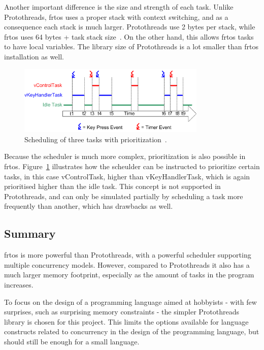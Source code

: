 Another important difference is the size and strength of each task. Unlike Protothreads, \gls{frtos} uses a proper stack with context switching, and as a consequence each stack is much larger. Protothreads use 2 bytes per stack, while \gls{frtos} uses 64 bytes + task stack size~\cite{AboutRTOS}. On the other hand, this allows \gls{frtos} tasks to have local variables. The library size of Protothreads is a lot smaller than \gls{frtos} installation as well.


\begin{figure}[htbp]
  \centering
  \includegraphics[width=0.8\textwidth]{figures/FreeRTOS_Prioritization.png}
  \caption{Scheduling of three tasks with prioritization~\cite{SchedulingRTOS}.}
  \label{fig:freertosprio}
\end{figure}


Because the scheduler is much more complex, prioritization is also possible in \gls{frtos}. Figure~\ref{fig:freertosprio} illustrates how the scheulder can be instructed to prioritize certain tasks, in this case vControlTask, higher than vKeyHandlerTask, which is again prioritised higher than the idle task. This concept is not supported in Protothreads, and can only be simulated partially by scheduling a task more frequently than another, which has drawbacks as well.


\subsection{Summary}\label{subsec:concurrencysummary}
\gls{frtos} is more powerful than Protothreads, with a powerful scheduler supporting multiple concurrency models. However, compared to Protothreads it also has a much larger memory footprint, especially as the amount of tasks in the program increases.

To focus on the design of a programming language aimed at hobbyists - with few surprises, such as surprising memory constraints - the simpler Protothreads library is chosen for this project. This limits the options available for language constructs related to concurrency in the design of the programming language, but should still be enough for a small language.
